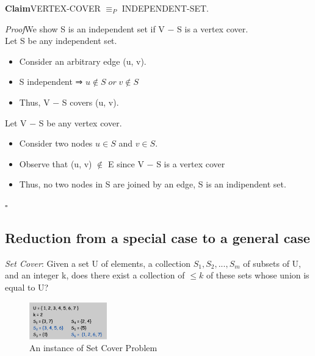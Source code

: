 \documentclass[11pt]{article}
\newenvironment{claim}[1]{\par\textbf{Claim}\space#1}{}
\newenvironment{proof}[1]{\par\textit{Proof}\space#1}{\hfill\ensuremath{\square}}
\begin{document}
\begin{claim}
VERTEX-COVER $≡_{P}$ INDEPENDENT-SET.
\end{claim}\\

\begin{proof}
We show S is an independent set if V − S is a vertex cover.\\

Let S be any independent set.
\begin{itemize}

\item{Consider an arbitrary edge (u, v).}
\item{S independent ⇒ $u \notin S \; or \;v \notin S$ }
\item{Thus, V − S covers (u, v)}.
\end{itemize}

Let V − S be any vertex cover.
\begin{itemize}
\item{Consider two nodes $u \in S$ and $v \in S$.}
\item{Observe that (u, v) $\notin$ E since V − S is a vertex cover }
\item{Thus, no two nodes in S are joined by an edge, S is an indipendent set}.
\end{itemize}

\end{proof}

\subsection{Reduction from a special case to a general case}

\emph{Set Cover}:
Given a set U of elements, a collection $S_{1}, S_{2}, . . . , S_{m}$ of subsets of U, and an integer k, does there exist a collection of $\leq k$ of these sets whose union is equal to U?

\begin{figure}[H]
		\centering
		\includegraphics[width=0.3\textwidth ]{setCover}
		\caption{An instance of Set Cover Problem}
\end{figure}

\\
\end{document}
